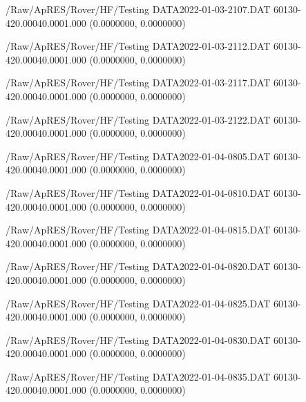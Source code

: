 \hfaprestable
{/Raw/ApRES/Rover/HF/Testing}%
{DATA2022-01-03-2107.DAT}%
{60}{1}{30}{-4}{20.000}{40.000}{1.000}%
{ (0.0000000, 0.0000000)}%
{}%
{}%

\hfaprestable
{/Raw/ApRES/Rover/HF/Testing}%
{DATA2022-01-03-2112.DAT}%
{60}{1}{30}{-4}{20.000}{40.000}{1.000}%
{ (0.0000000, 0.0000000)}%
{}%
{}%

\hfaprestable
{/Raw/ApRES/Rover/HF/Testing}%
{DATA2022-01-03-2117.DAT}%
{60}{1}{30}{-4}{20.000}{40.000}{1.000}%
{ (0.0000000, 0.0000000)}%
{}%
{}%

\hfaprestable
{/Raw/ApRES/Rover/HF/Testing}%
{DATA2022-01-03-2122.DAT}%
{60}{1}{30}{-4}{20.000}{40.000}{1.000}%
{ (0.0000000, 0.0000000)}%
{}%
{}%

\hfaprestable
{/Raw/ApRES/Rover/HF/Testing}%
{DATA2022-01-04-0805.DAT}%
{60}{1}{30}{-4}{20.000}{40.000}{1.000}%
{ (0.0000000, 0.0000000)}%
{}%
{}%

\hfaprestable
{/Raw/ApRES/Rover/HF/Testing}%
{DATA2022-01-04-0810.DAT}%
{60}{1}{30}{-4}{20.000}{40.000}{1.000}%
{ (0.0000000, 0.0000000)}%
{}%
{}%

\hfaprestable
{/Raw/ApRES/Rover/HF/Testing}%
{DATA2022-01-04-0815.DAT}%
{60}{1}{30}{-4}{20.000}{40.000}{1.000}%
{ (0.0000000, 0.0000000)}%
{}%
{}%

\hfaprestable
{/Raw/ApRES/Rover/HF/Testing}%
{DATA2022-01-04-0820.DAT}%
{60}{1}{30}{-4}{20.000}{40.000}{1.000}%
{ (0.0000000, 0.0000000)}%
{}%
{}%

\hfaprestable
{/Raw/ApRES/Rover/HF/Testing}%
{DATA2022-01-04-0825.DAT}%
{60}{1}{30}{-4}{20.000}{40.000}{1.000}%
{ (0.0000000, 0.0000000)}%
{}%
{}%

\hfaprestable
{/Raw/ApRES/Rover/HF/Testing}%
{DATA2022-01-04-0830.DAT}%
{60}{1}{30}{-4}{20.000}{40.000}{1.000}%
{ (0.0000000, 0.0000000)}%
{}%
{}%

\hfaprestable
{/Raw/ApRES/Rover/HF/Testing}%
{DATA2022-01-04-0835.DAT}%
{60}{1}{30}{-4}{20.000}{40.000}{1.000}%
{ (0.0000000, 0.0000000)}%
{}%
{}%

